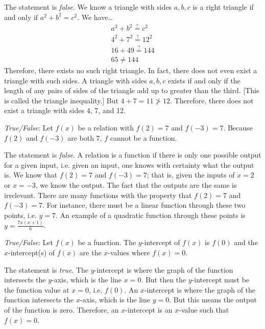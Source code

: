 \documentclass[11pt,letterpaper]{article}
\begin{document}
\sol The statement is \textit{false}. We know a triangle with sides $a, b, c$ is a right triangle if and only if $a^2 + b^2= c^2$. We have\dots
	\[
	\begin{gathered}
	a^2 + b^2\stackrel{?}{=} c^2 \\
	4^2 + 7^2\stackrel{?}{=} 12^2 \\
	16 + 49\stackrel{?}{=} 144 \\
	65 \neq 144
	\end{gathered}
	\]
Therefore, there exists no such right triangle. In fact, there does not even exist a triangle with such sides. A triangle with sides $a, b, c$ exists if and only if the length of any pairs of sides of the triangle add up to greater than the third. [This is called the triangle inequality.] But $4 + 7= 11 \not> 12$. Therefore, there does not exist a triangle with sides 4, 7, and 12. \pvspace{1.3cm}



 \textit{True/False}: Let $f(x)$ be a relation with $f(2)= 7$ and $f(-3)= 7$. Because $f(2)$ and $f(-3)$ are both $7$, $f$ cannot be a function. \pspace

\sol The statement is \textit{false}. A relation is a function if there is only one possible output for a given input, i.e. given an input, one knows with certainty what the output is. We know that $f(2)= 7$ and $f(-3)= 7$; that is, given the inputs of $x= 2$ or $x= -3$, we know the output. The fact that the outputs are the same is irrelevant. There are many functions with the property that $f(2)= 7$ and $f(-3)= 7$. For instance, there must be a linear function through these two points, i.e. $y= 7$. An example of a quadratic function through these points is $y= \frac{7x(x + 1)}{6}$. \pvspace{1.3cm}



 \textit{True/False}: Let $f(x)$ be a function. The $y$-intercept of $f(x)$ is $f(0)$ and the $x$-intercept(s) of $f(x)$ are the $x$-values where $f(x)= 0$. \pspace

\sol The statement is \textit{true}. The $y$-intercept is where the graph of the function intersects the $y$-axis, which is the line $x= 0$. But then the $y$-intercept must be the function value at $x= 0$, i.e. $f(0)$. An $x$-intercept is where the graph of the function intersects the $x$-axis, which is the line $y= 0$. But this means the output of the function is zero. Therefore, an $x$-intercept is an $x$-value such that $f(x)= 0$. \pvspace{1.3cm}
\end{document}
